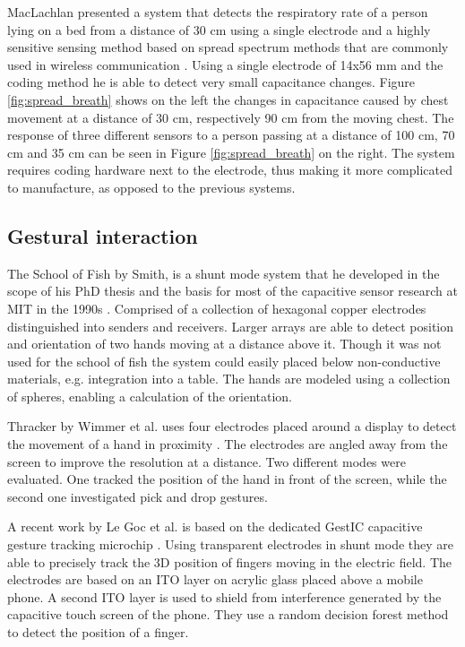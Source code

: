 MacLachlan presented a system that detects the respiratory rate of a person lying on a bed from a distance of 30 cm using a single electrode and a highly sensitive sensing method based on spread spectrum methods that are commonly used in wireless communication \cite{MacLachlan2004}. Using a single electrode of 14x56 mm and the coding method he is able to detect very small capacitance changes. Figure \ref{fig:spread_breath} shows on the left the changes in capacitance caused by chest movement at a distance of 30 cm, respectively 90 cm from the moving chest. The response of three different sensors to a person passing at a distance of 100 cm, 70 cm and 35 cm can be seen in Figure \ref{fig:spread_breath} on the right. The system requires coding hardware next to the electrode, thus making it more complicated to manufacture, as opposed to the previous systems.

\subsection{Gestural interaction}
The School of Fish by Smith, is a shunt mode system that he developed in the scope of his PhD thesis and the basis for most of the capacitive sensor research at MIT in the 1990s \cite{smith1999thesis}. Comprised of a collection of hexagonal copper electrodes distinguished into senders and receivers. Larger arrays are able to detect position and orientation of two hands moving at a distance above it. Though it was not used for the school of fish the system could easily placed below non-conductive materials, e.g. integration into a table. The hands are modeled using a collection of spheres, enabling a calculation of the orientation.

Thracker by Wimmer et al. uses four electrodes placed around a display to detect the movement of a hand in proximity \cite{Wimmer2007a}. The electrodes are angled away from the screen to improve the resolution at a distance. Two different modes were evaluated. One tracked the position of the hand in front of the screen, while the second one investigated pick and drop gestures. 

A recent work by Le Goc et al. is based on the dedicated GestIC capacitive gesture tracking microchip \cite{le2014low}. Using transparent electrodes in shunt mode they are able to precisely track the 3D position of fingers moving in the electric field. The electrodes are based on an ITO layer on acrylic glass placed above a mobile phone. A second ITO layer is used to shield from interference generated by the capacitive touch screen of the phone. They use a random decision forest method to detect the position of a finger.


 
